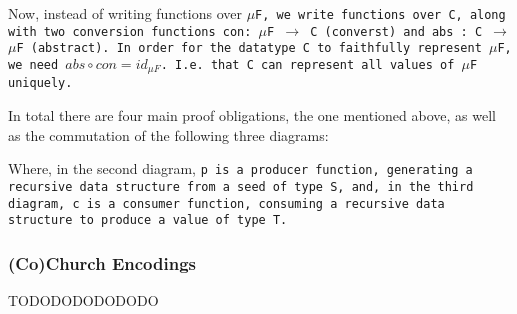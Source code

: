 Now, instead of writing functions over \tt{$\mu$F}, we write functions over \tt{C}, along with two conversion functions \tt{con: $\mu$F $\to$ C} (converst) and \tt{abs : C $\to$ $\mu$F} (abstract).
In order for the datatype \tt{C} to faithfully represent \tt{$\mu$F}, we need $abs \circ con = id_{\mu F}$. I.e. that \tt{C} can represent all values of \tt{$\mu$F} uniquely.

In total there are four main proof obligations, the one mentioned above, as well as the commutation of the following three diagrams:
\begin{figure}[H]\hfill
{}\hfill\null
{}\hfill\null
{}\hfill\null
\end{figure}
Where, in the second diagram, \tt{p} is a producer function, generating a recursive data structure from a seed of type \tt{S}, and, in the third diagram, \tt{c} is a consumer function, consuming a recursive data structure to produce a value of type \tt{T}.

\subsubsection{(Co)Church Encodings}
TODODODODODODO

\iffalse
\begin{itemize}
    \item 
\end{itemize}
\fi
